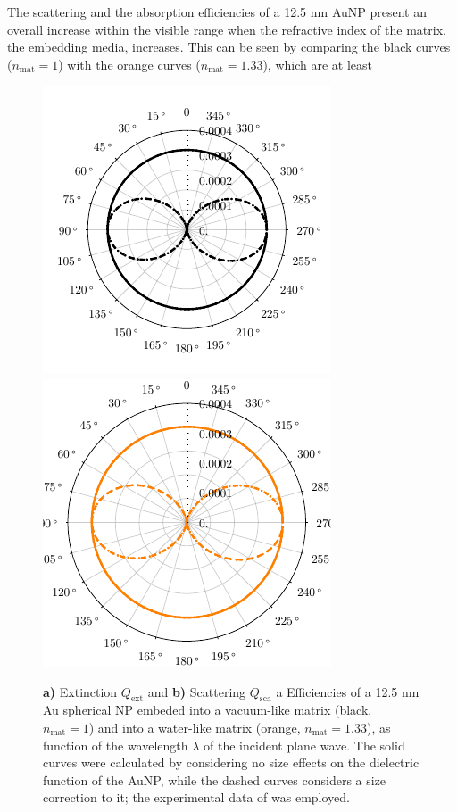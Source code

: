 The scattering and the absorption efficiencies of a 12.5 nm AuNP present an overall increase within the visible range when the refractive index of the matrix, the embedding media,  increases. This can be seen by comparing the black curves ($n_\text{mat} = 1$) with the orange curves ($n_\text{mat} = 1.33$), which are at least 
 

 
 
 
 \begin{figure}
 \includegraphics[scale=1]{1-Theory-Figs/Mie-Au/S-12--5nm-Au-in-Air.pdf}
 \includegraphics[scale=1]{1-Theory-Figs/Mie-Au/S-12--5nm-Au-in-H2O.pdf}
\caption[Extinction and Scattering Corss Section of a 12.5 nm Au spherical NP embeded into a vacuum- and into a waterlike environment]{ \textbf{a)} Extinction $Q_\text{ext}$ and \textbf{b)} Scattering $Q_\text{sca}$ a Efficiencies of a 12.5 nm Au spherical NP embeded into a vacuum-like matrix (black, $n_\text{mat} = 1$)  and into a water-like matrix (orange, $n_\text{mat} = 1.33$), as function of  the wavelength $\lambda$ of the incident plane wave.  The solid curves were calculated by considering no size effects on the dielectric function of the AuNP, while the dashed curves considers a size correction to it; the experimental data of \citeauthor{johnson_optical_1972} \cite{johnson_optical_1972} was employed.} 
 \end{figure}

